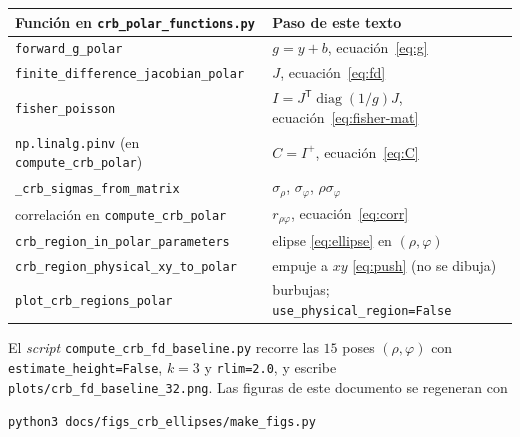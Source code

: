 \documentclass[11pt,a4paper]{article}
\newcommand{\code}[1]{\texttt{#1}}
\DeclareMathOperator{\diag}{diag}
\theoremstyle{definition}
\theoremstyle{plain}
\begin{document}
{\footnotesize
\begin{center}
\begin{tabular}{@{}p{6.6cm}p{8.2cm}@{}}
\toprule
Funci\'on en \code{crb\_polar\_functions.py} & Paso de este texto \\
\midrule
\code{forward\_g\_polar} &
  $g=y+b$, ecuaci\'on~\eqref{eq:g} \\
\code{finite\_difference\_jacobian\_polar} &
  $J$, ecuaci\'on~\eqref{eq:fd} \\
\code{fisher\_poisson} &
  $I=J^{\mathsf T}\diag(1/g)J$, ecuaci\'on~\eqref{eq:fisher-mat} \\
\code{np.linalg.pinv} (en \code{compute\_crb\_polar}) &
  $C=I^{+}$, ecuaci\'on~\eqref{eq:C} \\
\code{\_crb\_sigmas\_from\_matrix} &
  $\sigma_\rho$, $\sigma_\varphi$, $\rho\sigma_\varphi$ \\
correlaci\'on en \code{compute\_crb\_polar} &
  $r_{\rho\varphi}$, ecuaci\'on~\eqref{eq:corr} \\
\code{crb\_region\_in\_polar\_parameters} &
  elipse \eqref{eq:ellipse} en $(\rho,\varphi)$ \\
\code{crb\_region\_physical\_xy\_to\_polar} &
  empuje a $xy$ \eqref{eq:push} (no se dibuja) \\
\code{plot\_crb\_regions\_polar} &
  burbujas; \code{use\_physical\_region=False} \\
\bottomrule
\end{tabular}
\end{center}
}

El \emph{script} \code{compute\_crb\_fd\_baseline.py} recorre las $15$ poses
$(\rho,\varphi)$ con \code{estimate\_height=False}, $k=3$ y \code{rlim=2.0},
y escribe \code{plots/crb\_fd\_baseline\_32.png}. Las figuras de este
documento se regeneran con
\begin{center}
\code{python3 docs/figs\_crb\_ellipses/make\_figs.py}
\end{center}
\end{document}
